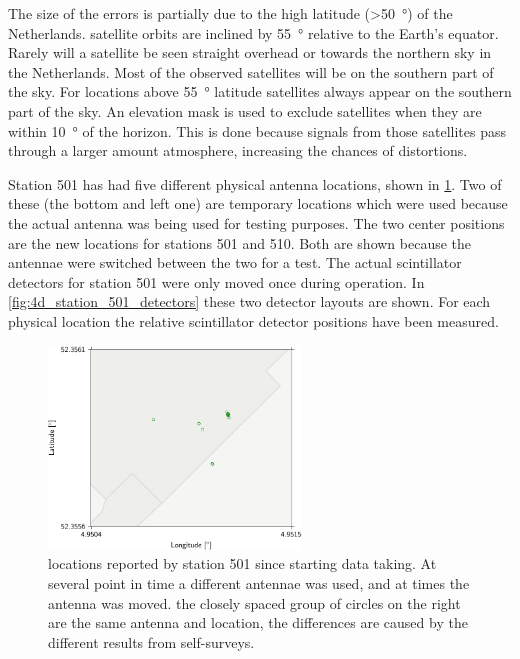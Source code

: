The size of the errors is partially due to the high latitude (\SI{>50}{\degree}) of the Netherlands. \gps satellite orbits are inclined by \SI{55}{\degree} relative to the Earth's equator. Rarely will a \gps satellite be seen straight overhead or towards the northern sky in the Netherlands. Most of the observed satellites will be on the southern part of the sky. For locations above \SI{55}{\degree} latitude \gps satellites always appear on the southern part of the sky. An elevation mask is used to exclude \gps satellites when they are within \SI{10}{\degree} of the horizon. This is done because signals from those satellites pass through a larger amount atmosphere, increasing the chances of distortions.

Station 501 has had five different physical \gps antenna locations, shown in \cref{fig:station_501_4D}. Two of these (the bottom and left one) are temporary locations which were used because the actual \gps antenna was being used for testing purposes. The two center positions are the new \gps locations for stations 501 and 510. Both are shown because the \gps antennae were switched between the two for a test. The actual scintillator detectors for station 501 were only moved once during operation. In \cref{fig:4d_station_501_detectors} these two detector layouts are shown. For each physical \gps location the relative scintillator detector positions have been measured.

\begin{figure}
    \centering
    \includegraphics[width=0.6\textwidth]
                    {plots/cluster/station_501_4D}
    \caption{\gps locations reported by station 501 since starting data taking. At several point in time a different \gps antennae was used, and at times the antenna was moved. the closely spaced group of circles on the right are the same \gps antenna and location, the differences are caused by the different results from self-surveys.}
    \label{fig:station_501_4D}
\end{figure}



